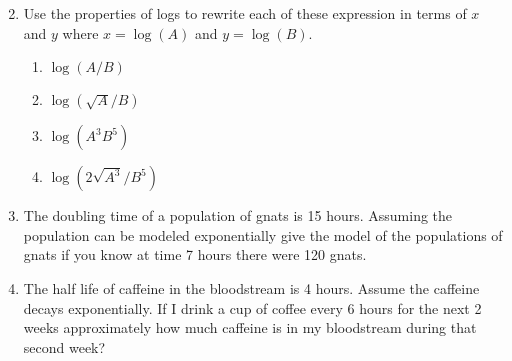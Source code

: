 \documentclass[12pt]{article}
\theoremstyle{plain}     %
\begin{document}
\begin{enumerate}
\begin{multicols}{2}
\begin{enumerate}
	\end{enumerate}
\end{multicols}
\newpage
\item Use the properties of logs to rewrite each of these expression in terms of $x$ and $y$ where $x=\log(A)$ and $y=\log(B)$.
	\begin{enumerate}
		\item $\log(A/B)$\\[1cm]
		\item $\log(\sqrt{A}/B)$\\[1cm]
		\item $\log(A^3B^5)$\\[1cm]
		\item $\log(2\sqrt{A^3}/B^5)$\\[1cm]
		
	\end{enumerate}
\item The doubling time of a population of gnats is 15 hours. Assuming the population can be modeled exponentially give the model of the populations of gnats if you know at time 7 hours there were 120 gnats.\\[4cm]

\item The half life of caffeine in the bloodstream is 4 hours. Assume the caffeine decays exponentially. If I drink a cup of coffee every 6 hours for the next 2 weeks approximately how much caffeine is in my bloodstream during that second week?
	
\end{enumerate}
	
\end{document}
